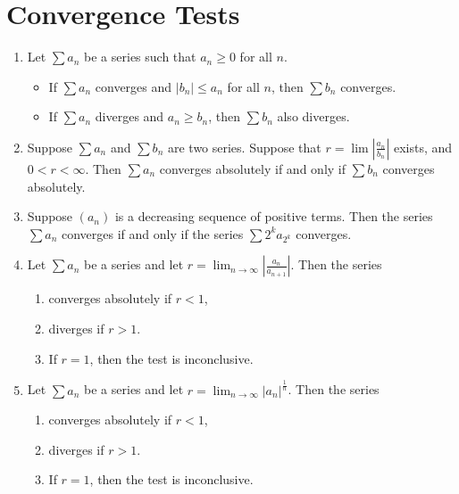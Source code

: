 \documentclass{article}
\theoremstyle{definition}
\begin{document}
    \section{Convergence Tests}
    \begin{enumerate}
        \item Let $\sum a_n$ be a series such that $a_n\geq 0$ for all $n$. 
        \begin{itemize}
            \item If $\sum a_n$ converges and $\left\vert b_n \right\vert \le a_n$ for all $n$, then $\sum b_n$ converges.
            \item If $\sum a_n$ diverges and $a_n \geq  b_n$, then $\sum b_n$ also diverges.
        \end{itemize}
        \item Suppose $\sum a_n$ and $\sum b_n$ are two series. Suppose that $r = \lim \left\vert \frac{a_n}{b_n} \right\vert $ exists, and $0<r<\infty$. Then $\sum a_n$ converges absolutely if and only if $\sum b_n$ converges absolutely.
        \item Suppose $\left( a_n \right) $ is a decreasing sequence of positive terms. Then the series $\sum a_n$ converges if and only if the series $\sum 2^k a_{2^k}$ converges.
        \item Let $\sum a_n$ be a series and let $r = \displaystyle \lim_{n \to \infty} \left\vert \frac{a_n}{a_{n+1}} \right\vert  $. Then the series
        \begin{enumerate}
            \item converges absolutely if $r<1$,
            \item diverges if $r>1$.
            \item If $r=1$,  then the test is inconclusive. 
        \end{enumerate}
        \item Let $\sum a_n$ be a series and let $r = \displaystyle \lim_{n \to \infty} \left\vert a_n \right\vert ^{\frac{1}{n}}$. Then the series
        \begin{enumerate}
            \item converges absolutely if $r<1$,
            \item diverges if $r>1$.
            \item If $r=1$,  then the test is inconclusive. 
        \end{enumerate}
        
    \end{enumerate}
\end{document}
